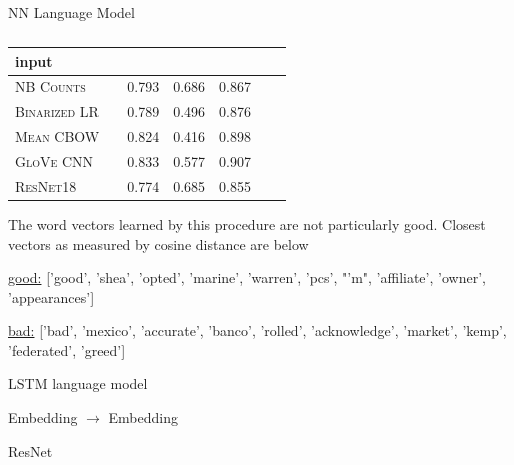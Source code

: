 \documentclass[11pt]{article}
\begin{document}
\begin{subsection}{NN Language Model}
\begin{table}[h]
\centering
\begin{tabular}{llrrrrr}
 \toprule
 input &  &  &  & \\
 \midrule
 \textsc{NB Counts} & & 0.793  & 0.686 & 0.867 & &\\
 \textsc{Binarized LR} & & 0.789 & 0.496 & 0.876& &\\
 \textsc{Mean CBOW} & & 0.824 & 0.416 & 0.898& &\\
 \textsc{GloVe CNN} & & 0.833  & 0.577 & 0.907& &\\
 \textsc{ResNet18} & & 0.774 & 0.685 & 0.855& &\\
 \bottomrule
\end{tabular}
\caption{\label{tab:conc} }
\end{table}

The word vectors learned by this procedure are not particularly good. Closest vectors as measured by cosine distance are below\\
\centerline{\underline{good:} ['good',
 'shea',
 'opted',
 'marine',
 'warren',
 'pcs',
 "'m",
 'affiliate',
 'owner',
 'appearances']}
 
 \centerline{\underline{bad:} ['bad',
 'mexico',
 'accurate',
 'banco',
 'rolled',
 'acknowledge',
 'market',
 'kemp',
 'federated',
 'greed']}


\end{subsection}

\begin{subsection}{LSTM language model}




\end{subsection}


\begin{subsection}{Embedding $\rightarrow$ Embedding}



\end{subsection}





\begin{subsection}{ResNet}



\end{subsection}
\end{document}
